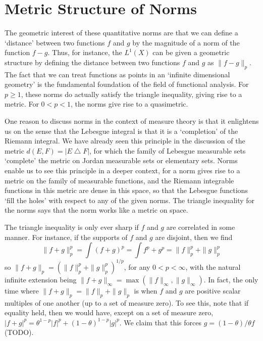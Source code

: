 \section{Metric Structure of Norms}

The geometric interest of these quantitative norms are that we can define a `distance' between two functions $f$ and $g$ by the magnitude of a norm of the function $f - g$. Thus, for instance, the $L^1(X)$ can be given a geometric structure by defining the distance between two functions $f$ and $g$ as $\| f - g \|_p$. The fact that we can treat functions as points in an `infinite dimensional geometry' is the fundamental foundation of the field of functional analysis. For $p \geq 1$, these norms do actually satisfy the triangle inequality, giving rise to a metric. For $0 < p < 1$, the norms give rise to a quasimetric.

One reason to discuss norms in the context of measure theory is that it enlightens us on the sense that the Lebesgue integral is that it is a `completion' of the Riemann integral. We have already seen this principle in the discussion of the metric $d(E,F) = |E \bigtriangleup F|$, for which the family of Lebesgue measurable sets `complete' the metric on Jordan measurable sets or elementary sets. Norms enable us to see this principle in a deeper context, for a norm gives rise to a metric on the family of measurable functions, and the Riemann integrable functions in this metric are dense in this space, so that the Lebesgue functions `fill the holes' with respect to any of the given norms. The triangle inequality for the norms says that the norm works like a metric on space.

The triangle inequality is only ever sharp if $f$ and $g$ are correlated in some manner. For instance, if the supports of $f$ and $g$ are disjoint, then we find
%
\[ \| f + g \|_p^p = \int (f + g)^p = \int f^p + g^p = \| f \|_p^p + \| g \|_p^p \]
%
so $\| f + g \|_p = (\| f \|_p^p + \| g \|_p^p)^{1/p}$, for any $0 < p < \infty$, with the natural infinite extension being $\| f + g \|_\infty = \max(\| f \|_\infty, \| g \|_\infty)$. In fact, the only time where $\| f + g \|_p = \| f \|_p + \| g \|_p$ is when $f$ and $g$ are positive scalar multiples of one another (up to a set of measure zero). To see this, note that if equality held, then we would have, except on a set of measure zero,
$|f + g|^p = \theta^{1-p} |f|^p + (1 - \theta)^{1 -p} |g|^p$. We claim that this forces $g = (1 - \theta)/\theta f$ (TODO).

